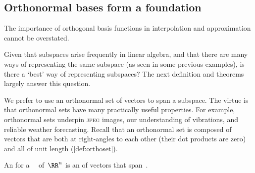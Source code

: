 





\subsection{Orthonormal bases form a foundation}


\begin{quoted}{\cite[\S5.3]{Cuyt2015}}
The importance of orthogonal basis functions in interpolation and approximation cannot be overstated.  
\end{quoted}

Given that subspaces arise frequently in linear algebra, and that there are many ways of representing the same subspace (as seen in some previous examples), is there a `best' way of representing subspaces?
The next definition and theorems largely answer this question.

We prefer to use an orthonormal set of vectors to span a subspace.
The virtue is that orthonormal sets have many practically useful properties.
For example, orthonormal sets underpin \textsc{jpeg} images, our understanding of vibrations, and reliable weather forecasting.
Recall that an orthonormal set is composed of vectors that are both at right-angles to each other (their dot products are zero) and all of unit length (\autoref{def:orthoset}).


\begin{definition} \label{def:orthobasis} 
An  for a ~\WW\ of~\(\RR^n\) is an  of vectors that span~\WW.
\end{definition}

